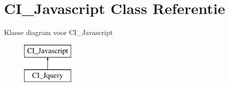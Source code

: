\hypertarget{class_c_i___javascript}{}\section{C\+I\+\_\+\+Javascript Class Referentie}
\label{class_c_i___javascript}
Klasse diagram voor C\+I\+\_\+\+Javascript\begin{figure}[H]
\begin{center}
\leavevmode
\includegraphics[height=2.000000cm]{class_c_i___javascript}
\end{center}
\end{figure}
